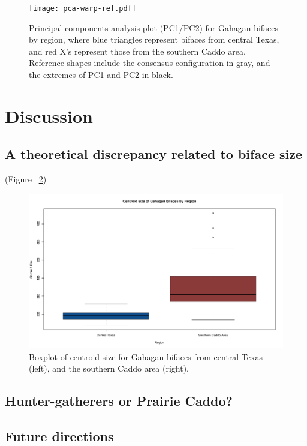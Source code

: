 \documentclass[review]{elsarticle}
\begin{document}
\begin{figure}[ht]\centering
\texttt{[image: pca-warp-ref.pdf]}
\caption{Principal components analysis plot (PC1/PC2) for Gahagan bifaces by region, where blue triangles represent bifaces from central Texas, and red X's represent those from the southern Caddo area. Reference shapes include the consensus configuration in gray, and the extremes of PC1 and PC2 in black.}
\label{fig:FigPCA}
\end{figure}

\section*{Discussion}



\subsection*{A theoretical discrepancy related to biface size}

(Figure ~\ref{fig:FigBox-CSize})

\begin{figure}[ht]\centering
\includegraphics[width=\linewidth]{box-csize.pdf}
\caption{Boxplot of centroid size for Gahagan bifaces from central Texas (left), and the southern Caddo area (right).}
\label{fig:FigBox-CSize}
\end{figure}

\subsection*{Hunter-gatherers or Prairie Caddo?}



\subsection*{Future directions}
\end{document}
